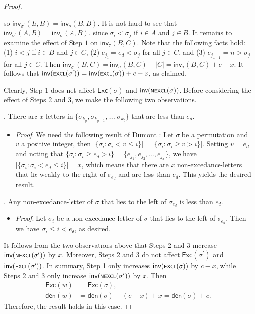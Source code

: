 \documentclass[12pt]{article}
\begin{document}
\begin{proof}
\begin{itemize}[leftmargin=1.6em]
	so  $\textsf{inv}_{\sigma^{\prime}}(B,B)=\textsf{inv}_{\sigma}(B,B)$.
	It is not hard to see that
	$\textsf{inv}_{\sigma^{\prime}}(A,B)=\textsf{inv}_{\sigma}(A,B)$,
	since‌ $\sigma_{i}<\sigma_{j}$ if $i\in A$ and $j\in B$.
	It remains to examine the effect of $\text{Step 1}$ on $\textsf{inv}_{\sigma}(B,C)$.
	Note that the following facts hold:
	(1) $i<j$ if $i\in B$ and $j\in C$,
	(2) $e_{j_{1}}=e_{d}<\sigma_{j}$ for all $j\in C$, and
	(3) $e_{j_{x+1}}=n>\sigma_{j}$ for all $j\in C$.  
	Then  $\textsf{inv}_{\sigma^{\prime}}(B,C)=\textsf{inv}_{\sigma}(B,C)+|C|=\textsf{inv}_{\sigma}(B,C)+c-x$.
	It follows that $\textsf{inv}(\textsf{\scriptsize{EXCL}}(\sigma^{\prime}))=\textsf{inv}(\textsf{\scriptsize{EXCL}}(\sigma))+ c-x$,
	as claimed.
\end{itemize}

\noindent Clearly, Step 1 does not affect $\textsf{Exc}(\sigma)$ and $\textsf{inv}(\textsf{\scriptsize{NEXCL}}(\sigma))$.
Before considering the effect of Steps 2 and 3, we make the following two observations.

. There are $x$ letters in $\{\sigma_{k_{y}},\sigma_{k_{y+1}},\ldots,\sigma_{k_{t}}\}$ that are less than $e_{d}$. 

\begin{itemize}[leftmargin=1.6em]
	\item[]\emph{Proof}. 
	We need the following result of Dumont \cite{Dumont-1974}:
	Let $\sigma$ be a permutation and $v$ a positive integer, then
	$|\{\sigma_{i}:\sigma_{i}<v\leq i\}|
	=|\{\sigma_{i}:\sigma_{i}\geq v>i\}|.$
	Setting $v=e_{d}$ and noting that 
	$\{\sigma_{i}:\sigma_{i}\geq e_{d}>i\}=\{e_{j_{1}},e_{j_{2}},\ldots,e_{j_{x}}\}$,
	we have $|\{\sigma_{i}:\sigma_{i}<e_{d}\leq i\}|=x$,
	which means that there are $x$ non-excedance-letters that lie weakly to the right of $\sigma_{e_{d}}$ and are less than $e_{d}$.
	This yields the desired result.
\end{itemize}

. Any non-excedance-letter of $\sigma$ that lies to the left of $\sigma_{e_{d}}$ is less than $e_{d}$.
\begin{itemize}[leftmargin=1.6em]
	\item[]\emph{Proof}. 
	Let $\sigma_{i}$ be a non-excedance-letter of $\sigma$ that lies to the left of $\sigma_{e_{d}}$. Then we have $\sigma_{i}\leq i< e_{d}$, as desired.
\end{itemize}	
\noindent 
It follows from the two observations above that Steps 2 and 3 increase $\textsf{inv}(\textsf{\scriptsize{NEXCL}}(\sigma^{\prime}))$ by $x$.
Moreover, Steps 2 and 3 do not affect $\textsf{Exc}(\sigma^{\prime})$ and 
$\textsf{inv}(\textsf{\scriptsize{EXCL}}(\sigma^{\prime}))$.
In summary,
Step 1 only increases $\textsf{inv}(\textsf{\scriptsize{EXCL}}(\sigma))$ by $c-x$, while Steps 2 and 3 only increase $\textsf{inv}(\textsf{\scriptsize{NEXCL}}(\sigma^{\prime}))$ by $x$.
Then 
\begin{align*}
\textsf{Exc}(w)&=\textsf{Exc}(\sigma), \\
\textsf{den}(w)&=\textsf{den}(\sigma)+(c-x)+x=\textsf{den}(\sigma)+c.
\end{align*}
Therefore, the result holds in this case.


\end{proof}
\end{document}
